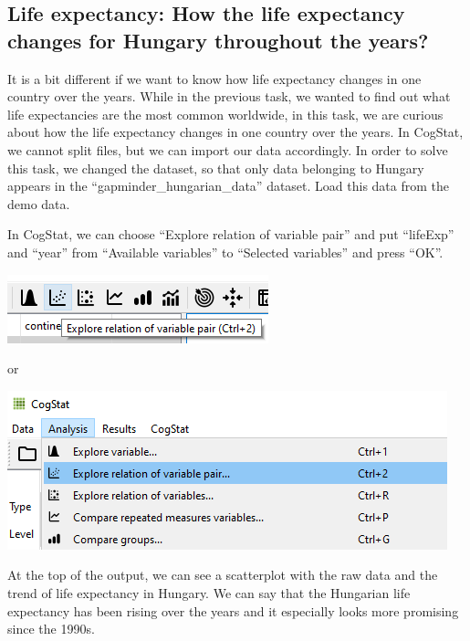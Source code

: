 \documentclass[
]{book}
\begin{document}
\hypertarget{life-expectancy-how-the-life-expectancy-changes-for-hungary-throughout-the-years}{%
\subsection{Life expectancy: How the life expectancy changes for Hungary throughout the years?}\label{life-expectancy-how-the-life-expectancy-changes-for-hungary-throughout-the-years}}

It is a bit different if we want to know how life expectancy changes in one country over the years. While in the previous task, we wanted to find out what life expectancies are the most common worldwide, in this task, we are curious about how the life expectancy changes in one country over the years. In CogStat, we cannot split files, but we can import our data accordingly. In order to solve this task, we changed the dataset, so that only data belonging to Hungary appears in the ``gapminder\_hungarian\_data'' dataset. Load this data from the demo data.

In CogStat, we can choose ``Explore relation of variable pair'' and put ``lifeExp'' and ``year'' from ``Available variables'' to ``Selected variables'' and press ``OK''.

\includegraphics{img/ch1/variablepair1.png}

or

\includegraphics{img/ch1/variablepair2.png}

At the top of the output, we can see a scatterplot with the raw data and the trend of life expectancy in Hungary. We can say that the Hungarian life expectancy has been rising over the years and it especially looks more promising since the 1990s.
\end{document}

